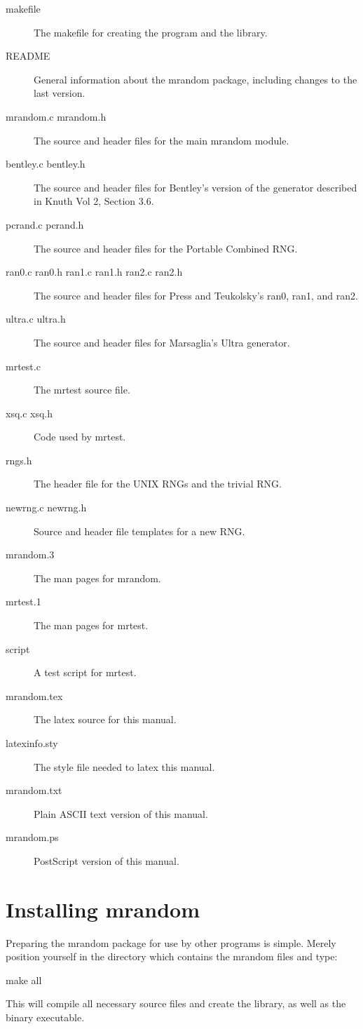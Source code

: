 \begin{description}
\item[makefile] The makefile for creating the  program and the 
library.
\item[README] General information about the mrandom package, including
changes to the last version.
\item[mrandom.c mrandom.h] The source and header files for the main
mrandom module.
\item[bentley.c bentley.h] The source and header files for Bentley's
  version of the generator described in Knuth Vol 2, Section 3.6.
\item[pcrand.c pcrand.h] The source and header files for the Portable Combined
RNG.
\item[ran0.c ran0.h ran1.c ran1.h ran2.c ran2.h] The source and header
files for Press and Teukolsky's ran0, ran1, and ran2.
\item[ultra.c ultra.h] The source and header files for Marsaglia's Ultra
generator.
\item[mrtest.c] The mrtest source file.
\item[xsq.c xsq.h] Code used by mrtest.
\item[rngs.h] The header file for the UNIX RNGs and the trivial RNG.
\item[newrng.c newrng.h] Source and header file templates for a new RNG.
\item[mrandom.3] The man pages for mrandom.
\item[mrtest.1] The man pages for mrtest.
\item[script] A test script for mrtest.
\item[mrandom.tex] The latex source for this manual.
\item[latexinfo.sty] The style file needed to latex this manual.
\item[mrandom.txt] Plain ASCII text version of this manual.
\item[mrandom.ps] PostScript version of this manual.
\end{description}

\section{Installing mrandom}
\label{sec:install}
Preparing the mrandom package for use by other programs is
simple.  Merely position yourself in the directory which contains the
mrandom files and type:\\
\begin{example}
make all\\
\end{example}
This will compile all necessary source files and create the
 library, as well as the  binary executable.


